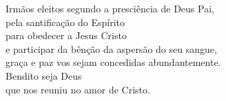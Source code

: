 Irmãos eleitos segundo a presciência de Deus Pai, \\ pela santificação do Espírito \\ para obedecer a Jesus Cristo \\ e participar da bênção da aspersão do seu sangue, \\ graça e paz vos sejam concedidas abundantemente. \\
\RbarRed{} Bendito seja Deus \\ que nos reuniu no amor de Cristo.
\vspace{.2cm} \\
